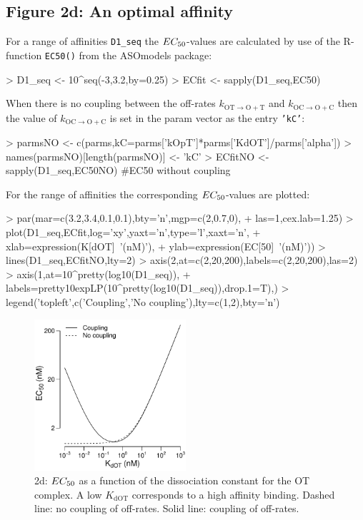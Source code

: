 \documentclass{article}
\newenvironment{Ncenter}{%
  \setlength\topsep{-10pt}
  \setlength\parskip{-100pt}
  \begin{center}
}{%
  \end{center}
}
\newcommand{\kmo}{k_{\mathrm{OT \to O+T}}}
\newcommand{\kD}{k_{\mathrm{OC \to O+C}}}
\newcommand{\EC}{EC_{\rm{50}}}
\newcommand{\KdOT}{K_{\mathrm{dOT}}}
\begin{document}
\subsection*{Figure 2d: An optimal affinity}
For a range of affinities \texttt{D1\_seq} the $\EC$-values are calculated by use of the R-function \texttt{EC50()} from the ASOmodels package:
\begin{Schunk}
\begin{Sinput}
> D1_seq <- 10^seq(-3,3.2,by=0.25)
> ECfit <- sapply(D1_seq,EC50)
\end{Sinput}
\end{Schunk}
When there is no coupling between the off-rates $\kmo$ and $\kD$ then the value of $\kD$ is set in the param vector as the entry \texttt{'kC'}:
\begin{Schunk}
\begin{Sinput}
> parmsNO <- c(parms,kC=parms['kOpT']*parms['KdOT']/parms['alpha'])
> names(parmsNO)[length(parmsNO)] <- 'kC'
> ECfitNO <- sapply(D1_seq,EC50NO) #EC50 without coupling
\end{Sinput}
\end{Schunk}
For the range of affinities the corresponding $\EC$-values are plotted:
\begin{Schunk}
\begin{Sinput}
> par(mar=c(3.2,3.4,0.1,0.1),bty='n',mgp=c(2,0.7,0),
+     las=1,cex.lab=1.25)
> plot(D1_seq,ECfit,log='xy',yaxt='n',type='l',xaxt='n',
+      xlab=expression(K[dOT]~'(nM)'),
+      ylab=expression(EC[50]~'(nM)'))
> lines(D1_seq,ECfitNO,lty=2)
> axis(2,at=c(2,20,200),labels=c(2,20,200),las=2)
> axis(1,at=10^pretty(log10(D1_seq)),
+      labels=pretty10expLP(10^pretty(log10(D1_seq)),drop.1=T),)
> legend('topleft',c('Coupling','No coupling'),lty=c(1,2),bty='n')
\end{Sinput}
\end{Schunk}
\begin{figure}[!h]
\begin{Ncenter}
\includegraphics[width=0.5\textwidth]{Vignette2-Figd}
\end{Ncenter}
\caption{2d: $\EC$ as a function of the dissociation constant for the OT complex. A low $\KdOT$ corresponds to a high affinity binding. Dashed line: no coupling of off-rates. Solid line: coupling of off-rates.}
\end{figure}
\end{document}
